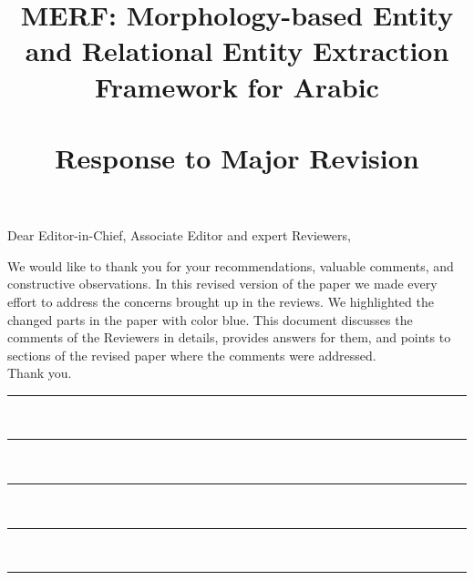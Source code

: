 \documentclass[11pt]{article}
\title{MERF: Morphology-based Entity and Relational Entity Extraction Framework for Arabic
 \\
~~ \\
  Response to Major Revision }
\date{}
\begin{document}
\maketitle

{\noindent Dear Editor-in-Chief, Associate Editor and expert Reviewers,}

We would like to thank you for your recommendations, valuable comments, 
and constructive observations. 
%
In this revised version of the paper we made every effort to address the 
concerns brought up in the reviews. 
%
We highlighted the changed parts in the paper with color blue. 
This document discusses the comments of the Reviewers 
in details, provides answers for them, and points to sections of the revised 
paper where the comments were addressed. 
\\
\noindent
Thank you.
\newline
\newline
\hrule
\newpage


~\newline
\hrule


~\newline
\hrule


~\newline
\hrule


~\newline
\hrule



%

%
\end{document}
